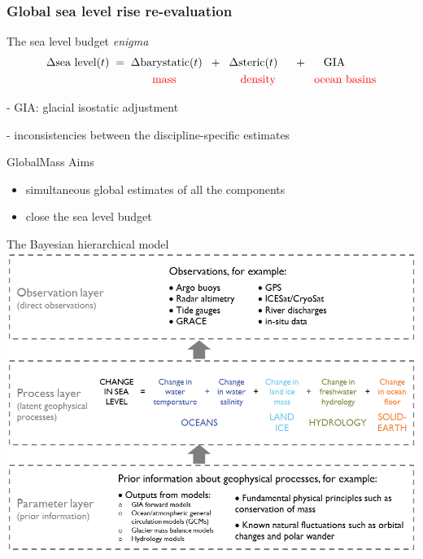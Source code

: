 \documentclass{beamer}
\begin{document}
\begin{frame}
\frametitle{Global sea level rise re-evaluation}
\begin{block}{The sea level budget \emph{enigma}}
\begin{align*}
&\Delta \mbox{sea level} (t) \hspace{0.1cm}= \hspace{0.1cm} \Delta\mbox{barystatic}(t) \hspace{0.2cm} + \hspace{0.2cm} \Delta\mbox{steric}(t) \hspace{0.5cm}+ \hspace{0.5cm} \mbox{GIA}\\
&\color{red}\hspace{3.3cm} \mbox{mass} \hspace{2cm}\mbox{density} \hspace{1.2cm} \mbox{ocean basins}
\end{align*}

- GIA: glacial isostatic adjustment

- inconsistencies between the discipline-specific estimates
\end{block}
\begin{block}{GlobalMass Aims}
\begin{itemize}
\item simultaneous global estimates of all the components
\item close the sea level budget
\end{itemize}
\end{block}

\end{frame}

\begin{frame}{The Bayesian hierarchical model}
\vspace{0.5cm}
\centering
\includegraphics[height =0.7\textheight]{images/GMconcept-simplified}

\end{frame}
\end{document}
